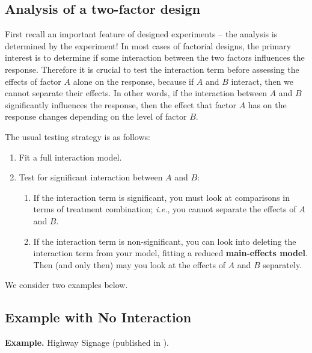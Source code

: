 \documentclass[
]{book}
\providecommand{\tightlist}{%
  \setlength{\itemsep}{0pt}\setlength{\parskip}{0pt}}
\begin{document}
\hypertarget{analysis-of-a-two-factor-design}{%
\subsection{Analysis of a two-factor design}\label{analysis-of-a-two-factor-design}}

First recall an important feature of designed experiments -- the analysis is determined by the experiment!
In most cases of factorial designs, the primary interest is to determine if some interaction between the two factors influences the response.
Therefore it is crucial to test the interaction term before assessing the effects of factor \(A\) alone on the response, because if \(A\) and \(B\) interact, then we cannot separate their effects.
In other words, if the interaction between \(A\) and \(B\) significantly influences the response, then the effect that factor \(A\) has on the response changes depending on the level of factor \(B\).

The usual testing strategy is as follows:

\begin{enumerate}
\def\labelenumi{\arabic{enumi}.}
\tightlist
\item
  Fit a full interaction model.
\item
  Test for significant interaction between \(A\) and \(B\):

  \begin{enumerate}
  \def\labelenumii{\alph{enumii}.}
  \tightlist
  \item
    If the interaction term is significant, you must look at comparisons in terms of treatment combination; \emph{i.e.}, you cannot separate the effects of \(A\) and \(B\).
  \item
    If the interaction term is non-significant, you can look into deleting the interaction term from your model, fitting a reduced \textbf{main-effects model}. Then (and only then) may you look at the effects of \(A\) and \(B\) separately.
  \end{enumerate}
\end{enumerate}

We consider two examples below.

\hypertarget{example-with-no-interaction}{%
\subsection{Example with No Interaction}\label{example-with-no-interaction}}

\textbf{Example.} Highway Signage (published in \citet{WeissText}).
\end{document}
